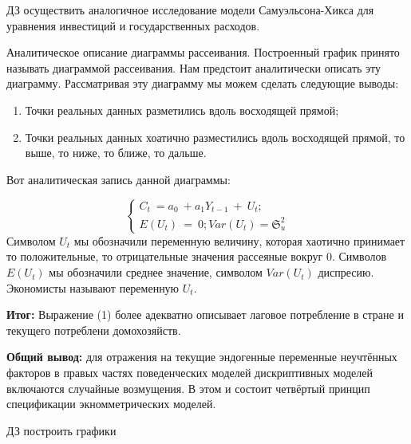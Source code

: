 \documentclass[12pt,a4paper]{article}
\begin{document}
	ДЗ осуществить аналогичное исследование модели Самуэльсона-Хикса для уравнения инвестиций и государственных расходов. 

	Аналитическое описание диаграммы рассеивания. Построенный график принято называть диаграммой рассеивания. Нам предстоит аналитически описать эту диаграмму. Рассматривая эту диаграмму мы можем сделать следующие выводы:
\begin{enumerate}
\item Точки реальных данных разметились вдоль восходящей прямой;
\item Точки реальных данных хоатично разместились вдоль восходящей прямой, то выше, то ниже, то ближе, то дальше.
\end{enumerate}

	Вот аналитическая запись данной диаграммы:


\begin{equation*}
\begin{cases}
C_{t} \ =a_{0} \ +a_{1} Y_{t-1} \ +\ U_{t} ;\\
E( U_{t}) \ =\ 0;Var( U_{t}) =\mathfrak{S}^{2}_{u}
\end{cases}
\end{equation*}
	Символом $\displaystyle U_{t}$ мы обозначили переменную величину, которая хаотично принимает то положительные, то отрицательные значения рассеяные вокруг 0. Символов $\displaystyle E( U_{t})$ мы обозначили среднее значение, символом $\displaystyle Var( U_{t})$ диспресию. Экономисты называют переменную $\displaystyle U_{t}$.

\textbf{	Итог: }Выражение (1) более адекватно описывает лаговое потребление в стране и текущего потреблени домохозяйств.

	\textbf{Общий вывод:} для отражения на текущие эндогенные переменные неучтённых факторов в правых частях поведенческих моделей дискриптивных моделей включаются случайные возмущения. В этом и состоит четвёртый принцип спецификации экномметрических моделей.

	ДЗ построить графики 
\end{document}
